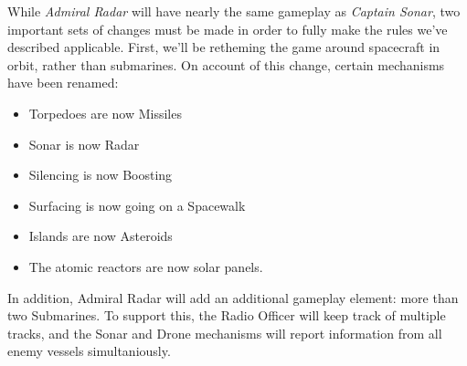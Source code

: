 While \textit{Admiral Radar} will have nearly the same gameplay as \textit{Captain Sonar}, two important sets of changes must be made in order to fully make the rules we've described applicable. First, we'll be retheming the game around spacecraft in orbit, rather than submarines. On account of this change, certain mechanisms have been renamed:

\begin{itemize}
\item Torpedoes are now Missiles
\item Sonar is now Radar
\item Silencing is now Boosting
\item Surfacing is now going on a Spacewalk
\item Islands are now Asteroids
\item The atomic reactors are now solar panels.
\end{itemize}

In addition, Admiral Radar will add an additional gameplay element: more than two Submarines. To support this, the Radio Officer will keep track of multiple tracks, and the Sonar and Drone mechanisms will report information from all enemy vessels simultaniously. 